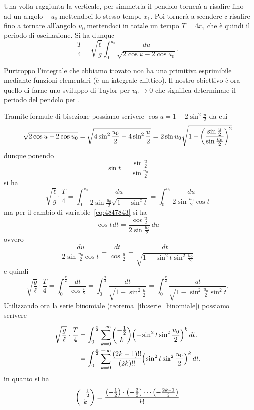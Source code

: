 \begin{example}
Una volta raggiunta la verticale, per simmetria il pendolo tornerà a risalire
fino ad un angolo $-u_0$ mettendoci lo stesso tempo $x_1$. Poi tornerà a scendere
e risalire fino a tornare all'angolo $u_0$ mettendoci in totale un tempo
$T=4x_1$ che è quindi il periodo di oscillazione. Si ha dunque
\[
  \frac{T}{4} = \sqrt{\frac \ell g}\int_0^{u_0} \frac{du}{\sqrt{2\cos u - 2\cos u_0}}.
\]

Purtroppo l'integrale che abbiamo trovato non ha una primitiva
esprimibile mediante funzioni elementari (è un integrale ellittico).
Il nostro obiettivo è ora quello di farne uno sviluppo di Taylor
per $u_0\to 0$ che significa determinare
il periodo del pendolo per .

Tramite formule di bisezione possiamo scrivere $\cos u = 1 - 2 \sin^2\frac u 2$
da cui
\[
 \sqrt{2\cos u - 2\cos u_0}
 = \sqrt{4\sin^2 \frac {u_0} 2 - 4 \sin^2 \frac{u}{2}}
 = 2\sin u_0 \sqrt{1-{\left( \frac{\sin \frac u 2}{\sin \frac {u_0}2} \right)}^2}
\]
dunque ponendo
\begin{equation}\label{eq:4847843}
 \sin t = \frac{\sin \frac u 2}{\sin \frac{u_0} 2}
\end{equation}
si ha
\[
  \sqrt{\frac \ell g} \cdot \frac T 4
  =  \int_0^{u_0} \frac{du}{2\sin \frac {u_0}2 \sqrt{1-\sin^2 t}}
  = \int_0^{u_0} \frac{du}{2\sin \frac{u_0}2 \cos t}
\]
ma per il cambio di variabile~\eqref{eq:4847843} si ha
\[
  \cos t \, dt = \frac{\cos \frac u 2 }{2 \sin \frac{u_0} 2}\, du
\]
ovvero
\[
 \frac{du}{2\sin \frac {u_0} 2 \cos t} = \frac{dt}{\cos \frac u 2}
 = \frac{dt}{\sqrt{1-\sin^2 t \sin^2\frac{u_0}{2}}}
\]
e quindi
\[
\sqrt{\frac g \ell} \cdot \frac{T}{4}
= \int_0^{\frac \pi 2} \frac{dt}{\cos \frac u 2}
= \int_0^{\frac \pi 2} \frac{dt}{\sqrt{1-\sin^2 \frac u 2}}
= \int_0^{\frac \pi 2} \frac{dt}{\sqrt{1-\sin^2 \frac{u_0}{2} \sin^2 t}}.
\]
Utilizzando ora la serie binomiale (teorema~\ref{th:serie_binomiale})
possiamo scrivere
\begin{align*}
\sqrt{\frac g \ell} \cdot\frac{T}{4}
&= \int_0^{\frac \pi 2} \sum_{k=0}^{+\infty}{-\frac 1 2 \choose k} {\left( -\sin^2 t\sin^2 \frac{u_0}2 \right)}^{k}\, dt.\\
&= \int_0^{\frac \pi 2} \sum_{k=0}^{+\infty}\frac{(2k-1)!!}{(2k)!!} {\left( \sin^2 t\sin^2 \frac{u_0}2 \right)}^{k}\, dt.
\end{align*}
in quanto si ha
\begin{align*}
  {-\frac 1 2 \choose k}
  &= \frac{\enclose{-\frac 1 2}\cdot \enclose{-\frac 3 2} \cdots \enclose{-\frac{2k-1} 2}}{k!}\\

\end{align*}
\end{example}
